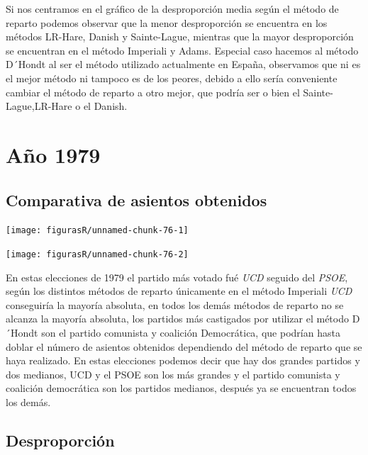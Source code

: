\documentclass[12pt,a4paper,]{book}
\numberwithin{dummy}{section}
\theoremstyle{ocrenumbox}
\theoremstyle{blacknumex}
\theoremstyle{blacknumbox}
\theoremstyle{ocrenum}
\theoremstyle{ocrenum}
\begin{document}
Si nos centramos en el gráfico de la desproporción media según el método
de reparto podemos observar que la menor desproporción se encuentra en
los métodos LR-Hare, Danish y Sainte-Lague, mientras que la mayor
desproporción se encuentran en el método Imperiali y Adams. Especial
caso hacemos al método D´Hondt al ser el método utilizado actualmente en
España, observamos que ni es el mejor método ni tampoco es de los
peores, debido a ello sería conveniente cambiar el método de reparto a
otro mejor, que podría ser o bien el Sainte-Lague,LR-Hare o el Danish.

\hypertarget{auxf1o-1979}{%
\section{Año 1979}\label{auxf1o-1979}}

\hypertarget{comparativa-de-asientos-obtenidos-1}{%
\subsection{Comparativa de asientos
obtenidos}\label{comparativa-de-asientos-obtenidos-1}}

\begin{center}\texttt{[image: figurasR/unnamed-chunk-76-1]} \end{center}

\begin{center}\texttt{[image: figurasR/unnamed-chunk-76-2]} \end{center}

En estas elecciones de 1979 el partido más votado fué \emph{UCD} seguido
del \emph{PSOE}, según los distintos métodos de reparto únicamente en el
método Imperiali \emph{UCD} conseguiría la mayoría absoluta, en todos
los demás métodos de reparto no se alcanza la mayoría absoluta, los
partidos más castigados por utilizar el método D´Hondt son el partido
comunista y coalición Democrática, que podrían hasta doblar el número de
asientos obtenidos dependiendo del método de reparto que se haya
realizado. En estas elecciones podemos decir que hay dos grandes
partidos y dos medianos, UCD y el PSOE son los más grandes y el partido
comunista y coalición democrática son los partidos medianos, después ya
se encuentran todos los demás.

\hypertarget{desproporciuxf3n-1}{%
\subsection{Desproporción}\label{desproporciuxf3n-1}}
\end{document}
